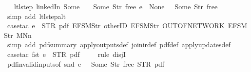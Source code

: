 \begin{isabellebody}
\ \ \ ltl{\isacharunderscore}step\ linkedIn\ {\isacharparenleft}Some\ {}{\isacharparenright}\ {\isacharparenleft}{\isacharless}{\isachargreater}{\isacharparenleft}{}\ {\isachardollar}{\isacharcolon}{\isacharequal}\ Some\ {\isacharparenleft}Str\ {\isacharprime}{\isacharprime}free{\isacharprime}{\isacharprime}{\isacharparenright}{\isacharparenright}{\isacharparenright}\ e\ {\isacharequal}\ {\isacharparenleft}None{\isacharcomma}\ {\isacharbrackleft}{\isacharbrackright}{\isacharcomma}{\isacharparenleft}{\isacharless}{\isachargreater}{\isacharparenleft}{}\ {\isachardollar}{\isacharcolon}{\isacharequal}\ Some\ {\isacharparenleft}Str\ {\isacharprime}{\isacharprime}free{\isacharprime}{\isacharprime}{\isacharparenright}{\isacharparenright}{\isacharparenright}{\isacharparenright}{\isachardoublequoteclose}\isanewline
%
\isadelimproof
\ \ %
\endisadelimproof
%
\isatagproof
{}\isamarkupfalse%
\ {\isacharparenleft}simp\ add{\isacharcolon}\ ltl{\isacharunderscore}step{\isacharunderscore}alt{\isacharparenright}\isanewline
\ \ \isamarkupfalse%
\ {\isacharparenleft}case{\isacharunderscore}tac\ {\isachardoublequoteopen}e\ {\isacharequal}\ {\isacharparenleft}STR\ {\isacharprime}{\isacharprime}pdf{\isacharprime}{\isacharprime}{\isacharcomma}\ {\isacharbrackleft}EFSM{\isachardot}Str\ {\isacharprime}{\isacharprime}otherID{\isacharprime}{\isacharprime}{\isacharcomma}\ EFSM{\isachardot}Str\ {\isacharprime}{\isacharprime}OUT{\isacharunderscore}OF{\isacharunderscore}NETWORK{\isacharprime}{\isacharprime}{\isacharcomma}\ EFSM{\isachardot}Str\ {\isacharprime}{\isacharprime}MNn{}{\isacharprime}{\isacharprime}{\isacharbrackright}{\isacharparenright}{\isachardoublequoteclose}{\isacharparenright}\isanewline
\ \ \ \isamarkupfalse%
\ {\isacharparenleft}simp\ add{\isacharcolon}\ pdf{\isacharunderscore}summary\ apply{\isacharunderscore}outputs{\isacharunderscore}def\ join{\isacharunderscore}ir{\isacharunderscore}def\ pdf{}{\isacharunderscore}def\ apply{\isacharunderscore}updates{\isacharunderscore}def{\isacharparenright}\isanewline
\ \ \isamarkupfalse%
\ {\isacharparenleft}case{\isacharunderscore}tac\ {\isachardoublequoteopen}fst\ e\ {\isacharequal}\ STR\ {\isacharprime}{\isacharprime}pdf{\isacharprime}{\isacharprime}{\isachardoublequoteclose}{\isacharparenright}\isanewline
\ \ \ \isamarkupfalse%
\ {\isacharparenleft}rule\ disjI{}{\isacharparenright}\isanewline
\ \ \isamarkupfalse%
\ pdf{\isacharunderscore}{}{\isacharunderscore}invalid{\isacharunderscore}inputs{\isacharbrackleft}of\ {\isachardoublequoteopen}snd\ e{\isachardoublequoteclose}\ {\isachardoublequoteopen}{\isacharparenleft}{\isacharless}{\isachargreater}{\isacharparenleft}{}\ {\isachardollar}{\isacharcolon}{\isacharequal}\ Some\ {\isacharparenleft}Str\ {\isacharprime}{\isacharprime}free{\isacharprime}{\isacharprime}{\isacharparenright}{\isacharparenright}{\isacharparenright}{\isachardoublequoteclose}\ {\isachardoublequoteopen}STR\ {\isacharprime}{\isacharprime}pdf{\isacharprime}{\isacharprime}{\isachardoublequoteclose}{\isacharbrackright}\isanewline

\end{isabellebody}
